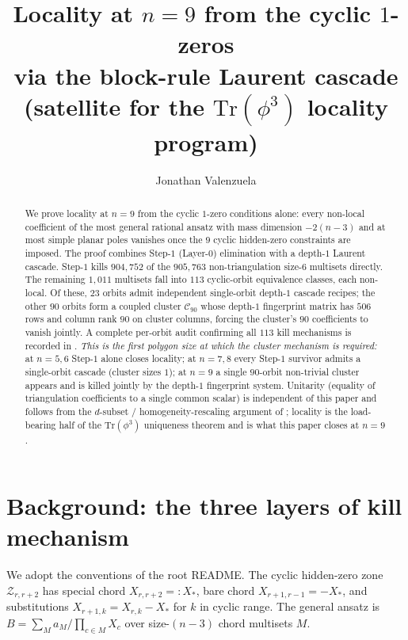 \documentclass[11pt]{article}
\title{Locality at $n=9$ from the cyclic $1$-zeros\\
       \large via the block-rule Laurent cascade\\
       \small (satellite for the $\mathrm{Tr}(\phi^3)$ locality program)}
\author{Jonathan Valenzuela}
\date{}
\theoremstyle{definition}
\begin{document}
\maketitle

\begin{abstract}
We prove locality at $n=9$ from the cyclic $1$-zero conditions alone:
every non-local coefficient of the most general rational ansatz with
mass dimension $-2(n{-}3)$ and at most simple planar poles vanishes
once the $9$ cyclic hidden-zero constraints are imposed. The proof
combines Step-$1$ (Layer-$0$) elimination with a depth-$1$ Laurent
cascade. Step-$1$ kills $904{,}752$ of the $905{,}763$
non-triangulation size-$6$ multisets directly. The remaining
$1{,}011$ multisets fall into $113$ cyclic-orbit equivalence classes,
each non-local. Of these, $23$ orbits admit independent
single-orbit depth-$1$ cascade recipes; the other $90$ orbits form a
coupled cluster $\mathcal C_{90}$ whose depth-$1$ fingerprint matrix
has $506$ rows and column rank $90$ on cluster columns, forcing the
cluster's $90$ coefficients to vanish jointly. A complete per-orbit
audit confirming all $113$ kill mechanisms is recorded in
\cite{n9status}. \emph{This is the first polygon size at which the
cluster mechanism is required:} at $n=5,6$ Step-$1$ alone closes
locality; at $n=7,8$ every Step-$1$ survivor admits a single-orbit
cascade (cluster sizes $1$); at $n=9$ a single $90$-orbit
non-trivial cluster appears and is killed jointly by the depth-$1$
fingerprint system.
Unitarity (equality of triangulation coefficients to a single
common scalar) is independent of this paper and follows from the
$d$-subset / homogeneity-rescaling argument of
\cite{notes11,notes18,subsetvan}; locality is the load-bearing half
of the $\mathrm{Tr}(\phi^3)$ uniqueness theorem and is what this
paper closes at $n=9$.
\end{abstract}

\section{Background: the three layers of kill mechanism}\label{sec:layers}

We adopt the conventions of the root README. The cyclic hidden-zero
zone $\mathcal Z_{r,r+2}$ has special chord $X_{r,r+2}=:X_*$, bare
chord $X_{r+1,r-1}=-X_*$, and substitutions $X_{r+1,k}=X_{r,k}-X_*$
for $k$ in cyclic range. The general ansatz is
$B=\sum_M a_M/\prod_{c\in M}X_c$ over size-$(n{-}3)$ chord multisets
$M$.
\end{document}

